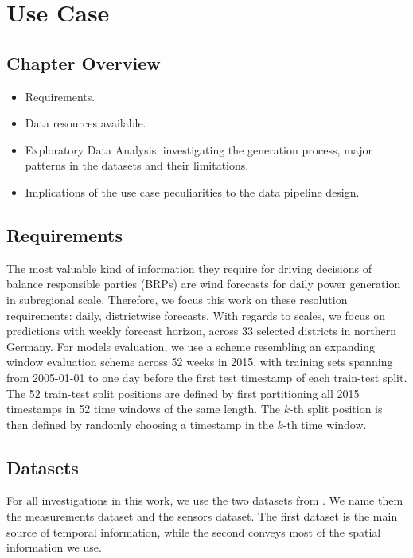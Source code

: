 \graphicspath{{./figures/usecase/}}

\chapter{Use Case}

\section*{Chapter Overview}
\begin{itemize}
    \item Requirements.
    \item Data resources available.
    \item Exploratory Data Analysis: investigating the generation process, major patterns in the datasets and their limitations.
    \item Implications of the use case peculiarities to the data pipeline design.
\end{itemize}
\pagebreak


\section{Requirements}\label{sec:reqs}
The most valuable kind of information they require for driving decisions of balance responsible parties (BRPs) are wind forecasts for daily power generation in subregional scale.
Therefore, we focus this work on these resolution requirements: daily, districtwise forecasts.
With regards to scales, we focus on predictions with weekly forecast horizon, across 33 selected districts in northern Germany.
For models evaluation, we use a scheme resembling an expanding window evaluation scheme across 52 weeks in 2015, with training sets spanning from 2005-01-01 to one day before the first test timestamp of each train-test split.
The 52 train-test split positions are defined by first partitioning all 2015 timestamps in 52 time windows of the same length.
The $k$-th split position is then defined by randomly choosing a timestamp in the $k$-th time window.

\section{Datasets}\label{sec:datasets}
For all investigations in this work, we use the two datasets from \cite{becker2017completion}.
We name them the measurements dataset and the sensors dataset.
The first dataset is the main source of temporal information, while the second conveys most of the spatial information we use.

